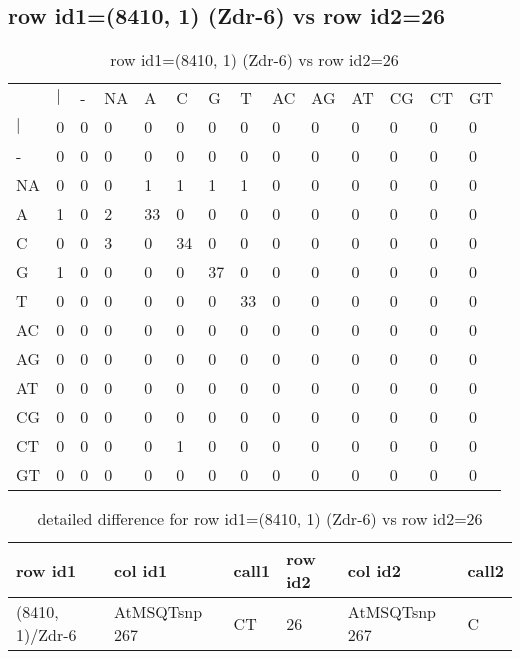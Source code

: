 \subsection{row id1=(8410, 1) (Zdr-6) vs row id2=26}
\begin{center}
\begin{longtable}{|l|l|l|l|l|l|l|l|l|l|l|l|l|l|}
\caption{row id1=(8410, 1) (Zdr-6) vs row id2=26} \label{table_dm676}\\
\hline
\\
\hline
&$|$&-&NA&A&C&G&T&AC&AG&AT&CG&CT&GT\\
$|$&0&0&0&0&0&0&0&0&0&0&0&0&0\\
-&0&0&0&0&0&0&0&0&0&0&0&0&0\\
NA&0&0&0&1&1&1&1&0&0&0&0&0&0\\
A&1&0&2&33&0&0&0&0&0&0&0&0&0\\
C&0&0&3&0&34&0&0&0&0&0&0&0&0\\
G&1&0&0&0&0&37&0&0&0&0&0&0&0\\
T&0&0&0&0&0&0&33&0&0&0&0&0&0\\
AC&0&0&0&0&0&0&0&0&0&0&0&0&0\\
AG&0&0&0&0&0&0&0&0&0&0&0&0&0\\
AT&0&0&0&0&0&0&0&0&0&0&0&0&0\\
CG&0&0&0&0&0&0&0&0&0&0&0&0&0\\
CT&0&0&0&0&1&0&0&0&0&0&0&0&0\\
GT&0&0&0&0&0&0&0&0&0&0&0&0&0\\
\hline
\end{longtable}
\end{center}

\begin{center}
\begin{longtable}{|l|l|l|l|l|l|}
\caption{detailed difference for row id1=(8410, 1) (Zdr-6) vs row id2=26} \label{table_dm677}\\
\hline
row id1&col id1&call1&row id2&col id2&call2\\
\hline
(8410, 1)/Zdr-6&AtMSQTsnp 267&CT&26&AtMSQTsnp 267&C\\
\hline
\end{longtable}
\end{center}

